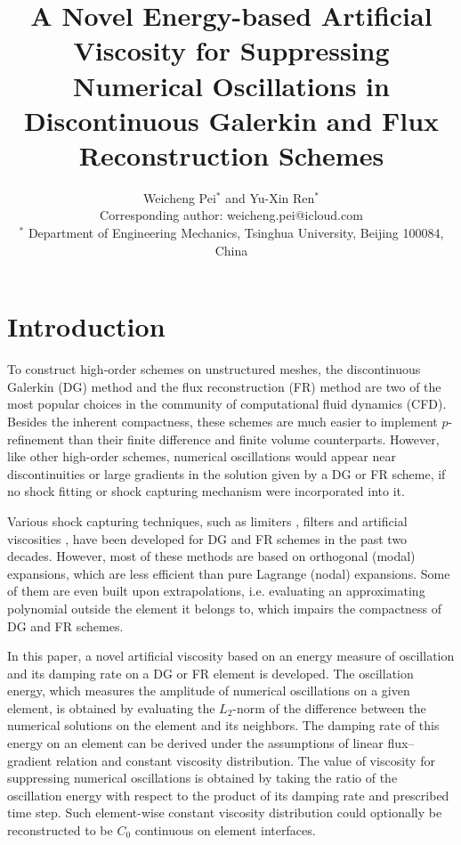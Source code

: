 \documentclass[10pt,draft]{article}
\title{
\bf A Novel Energy-based Artificial Viscosity for Suppressing Numerical Oscillations in Discontinuous Galerkin and Flux Reconstruction Schemes
}
\author{
Weicheng Pei$^{*}$ and Yu-Xin Ren$^{*}$\\
Corresponding author: weicheng.pei@icloud.com\\
$^{*}$ Department of Engineering Mechanics, Tsinghua University, Beijing 100084, China
}
\date{}
\begin{document}
\maketitle
\afterpage{\fancyhead{}}

\centerline{
}
\vskip0.5cm 

\section{Introduction}
To construct high-order schemes on unstructured meshes, the discontinuous Galerkin (DG) method \cite{Cockburn_2001,Hesthaven_2008} and the flux reconstruction (FR) method \cite{Huynh_2007,Huynh_2014} are two of the most popular choices in the community of computational fluid dynamics (CFD).
%
Besides the inherent compactness, these schemes are much easier to implement $p$-refinement than their finite difference and finite volume counterparts.
%
However, like other high-order schemes, numerical oscillations would appear near discontinuities or large gradients in the solution given by a DG or FR scheme, if no shock fitting or shock capturing mechanism were incorporated into it.
%

%
Various shock capturing techniques, such as limiters \cite{Zhong_2013,Zhu_2013,Zhu_2020,Zhu_2023,Li_2020}, filters \cite{Dzanic_2022} and artificial viscosities \cite{Persson_2006,Klockner_2011,Discacciati_2020}, have been developed for DG and FR schemes in the past two decades.
%
However, most of these methods are based on orthogonal (modal) expansions, which are less efficient than pure Lagrange (nodal) expansions.
%
Some of them are even built upon extrapolations, i.e. evaluating an approximating polynomial outside the element it belongs to, which impairs the compactness of DG and FR schemes.
%

%
In this paper, a novel artificial viscosity based on an energy measure of oscillation and its damping rate on a DG or FR element is developed.
%
The oscillation energy, which measures the amplitude of numerical oscillations on a given element, is obtained by evaluating the $L_2$-norm of the difference between the numerical solutions on the element and its neighbors.
%
The damping rate of this energy on an element can be derived under the assumptions of linear flux--gradient relation and constant viscosity distribution.
%
The value of viscosity for suppressing numerical oscillations is obtained by taking the ratio of the oscillation energy with respect to the product of its damping rate and prescribed time step.
%
Such element-wise constant viscosity distribution could optionally be reconstructed to be $C_0$ continuous on element interfaces.
\end{document}
